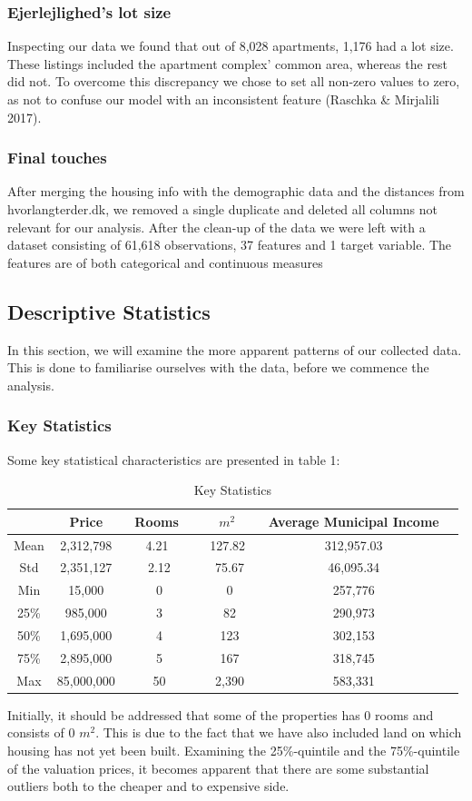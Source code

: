 \documentclass[12pt,a4paper]{article}
\begin{document}
\subsubsection{Ejerlejlighed's lot size}
Inspecting our data we found that out of 8,028 apartments, 1,176 had a lot size. These listings included the apartment complex' common area, whereas the rest did not. To overcome this discrepancy we chose to set all non-zero values to zero, as not to confuse our model with an inconsistent feature (Raschka \& Mirjalili 2017).

\subsubsection{Final touches}
After merging the housing info with the demographic data and the distances from hvorlangterder.dk, we removed a single duplicate and deleted all columns not relevant for our analysis. After the clean-up of the data we were left with a dataset consisting of 61,618  observations, 37 features and 1 target variable. The features are of both categorical and continuous measures

\subsection{Descriptive Statistics}
In this section, we will examine the more apparent patterns of our collected data. This is done to familiarise ourselves with the data, before we commence the analysis.
\subsubsection{Key Statistics}
Some key statistical characteristics are presented in table 1:
\begin{table}[H]
\begin{center}
\caption{Key Statistics\label{time}}
\begin{tabular}{| c | c | c | c | c | c |} 
\hline
   & Price & \, Rooms \ & \ $m^2$ \ & Average Municipal Income \\ \hline
   Mean & 2,312,798 & \ 4.21 \  & \ 127.82 \ & 312,957.03 \\ \hline
   Std & 2,351,127 & 2.12 & 75.67 & 46,095.34 \\ \hline
   Min & 15,000 & 0 & 0 & 257,776 \\ \hline
   25\% & 985,000 & 3 & 82 & 290,973 \\ \hline
   50\% & 1,695,000 & 4 & 123 & 302,153 \\ \hline
   75\% & 2,895,000 & 5 & 167 & 318,745 \\ \hline
   Max & 85,000,000 & 50 & 2,390 & 583,331 \\ \hline
\end{tabular}
\end{center}
\end{table} 
Initially, it should be addressed that some of the properties has 0 rooms and consists of 0 $m^2$.  This is due to the fact that we have also included land on which housing has not yet been built. Examining the 25\%-quintile and the 75\%-quintile of the valuation prices, it becomes apparent that there are some substantial outliers both to the cheaper and to expensive side.
\end{document}
